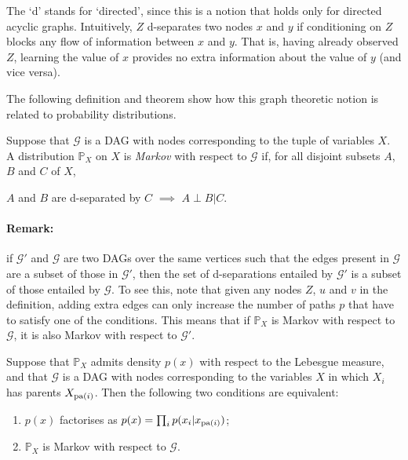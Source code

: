 The `d' stands for `directed', since this is a notion that holds only for directed acyclic graphs.
Intuitively, $Z$ d-separates two nodes $x$ and $y$ if conditioning on $Z$ blocks any flow of information between $x$ and $y$. That is, having already observed $Z$, learning the value of $x$ provides no extra information about the value of $y$ (and vice versa).

The following definition and theorem show how this graph theoretic notion is related to probability distributions.
\\

\begin{definition}[Markov]\cite{cite something?}
Suppose that $\mathcal{G}$ is a DAG with nodes corresponding to the tuple of variables $X$. 
A distribution $\mathbb{P}_X$ on $X$ is \emph{Markov} with respect to $\mathcal{G}$ if, for all
disjoint subsets $A$, $B$ and $C$ of $X$, 
\begin{center}
$A$ and $B$ are d-separated by $C$ $\implies$ $A \perp B | C$.
\end{center}
\end{definition}
\medskip

\paragraph{Remark:} if $\mathcal{G}'$ and $\mathcal{G}$ are two DAGs over the same vertices such that the edges present in $\mathcal{G}$ are a subset of those in $\mathcal{G}'$, then the set of d-separations entailed by $\mathcal{G}'$ is a subset of those entailed by $\mathcal{G}$. To see this, note that given any nodes $Z$, $u$ and $v$ in the definition, adding extra edges can only increase the number of paths $p$ that have to satisfy one of the conditions. 
This means that if $\mathbb{P}_X$ is Markov with respect to $\mathcal{G}$, it is also Markov with respect to $\mathcal{G}'$.
\medskip


\begin{theorem}\cite{lauritzen}
Suppose that $\mathbb{P}_X$ admits density $p(x)$ with respect to the Lebesgue measure, and that $\mathcal{G}$ is a DAG with nodes corresponding to the variables $X$ in which $X_i$ has parents $X_{\operatorname{pa}(i)}$. 
Then the following two conditions are equivalent:
\begin{enumerate}
\item $p(x)$ factorises as $p(x) = \prod_i p(x_i |x_{\operatorname{pa}(i)})$;
\item $\mathbb{P}_X$ is Markov with respect to $\mathcal{G}$.
\end{enumerate}
\end{theorem}
\medskip

